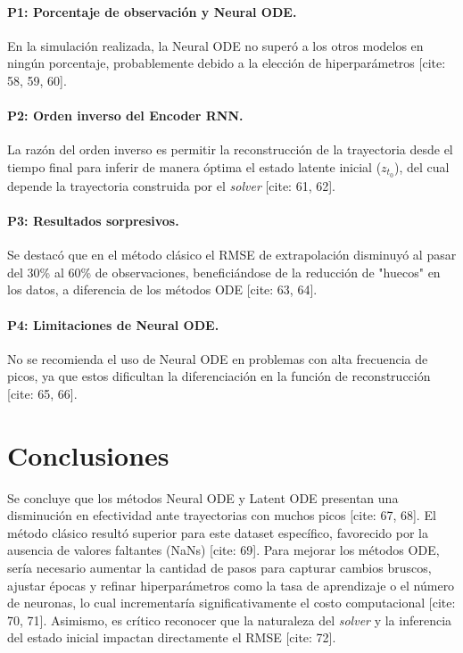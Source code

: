 \documentclass[twocolumn, 10pt]{article}
\begin{document}
\paragraph{P1: Porcentaje de observación y Neural ODE.} En la simulación realizada, la Neural ODE no superó a los otros modelos en ningún porcentaje, probablemente debido a la elección de hiperparámetros [cite: 58, 59, 60].

\paragraph{P2: Orden inverso del Encoder RNN.} La razón del orden inverso es permitir la reconstrucción de la trayectoria desde el tiempo final para inferir de manera óptima el estado latente inicial ($z_{t_0}$), del cual depende la trayectoria construida por el \textit{solver} [cite: 61, 62].

\paragraph{P3: Resultados sorpresivos.} Se destacó que en el método clásico el RMSE de extrapolación disminuyó al pasar del 30\% al 60\% de observaciones, beneficiándose de la reducción de "huecos" en los datos, a diferencia de los métodos ODE [cite: 63, 64].

\paragraph{P4: Limitaciones de Neural ODE.} No se recomienda el uso de Neural ODE en problemas con alta frecuencia de picos, ya que estos dificultan la diferenciación en la función de reconstrucción [cite: 65, 66].

\section{Conclusiones}
Se concluye que los métodos Neural ODE y Latent ODE presentan una disminución en efectividad ante trayectorias con muchos picos [cite: 67, 68]. El método clásico resultó superior para este dataset específico, favorecido por la ausencia de valores faltantes (NaNs) [cite: 69]. Para mejorar los métodos ODE, sería necesario aumentar la cantidad de pasos para capturar cambios bruscos, ajustar épocas y refinar hiperparámetros como la tasa de aprendizaje o el número de neuronas, lo cual incrementaría significativamente el costo computacional [cite: 70, 71]. Asimismo, es crítico reconocer que la naturaleza del \textit{solver} y la inferencia del estado inicial impactan directamente el RMSE [cite: 72].
\end{document}
